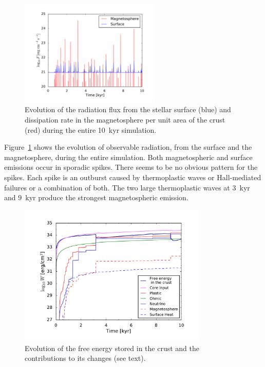 \begin{figure}[h]
\centering
\includegraphics[width=0.6\textwidth]{pics/chap2/lum.pdf} 
\caption[Evolution of the radiation flux]{Evolution of the radiation flux from the stellar surface (blue) and dissipation rate in the magnetosphere per unit area of the crust (red) during the entire 10~kyr simulation.
}
\label{lum}
\end{figure}

Figure~\ref{lum} shows the evolution of observable radiation, from the surface and the magnetosphere, during the entire simulation. 
Both magnetospheric and surface emissions occur in sporadic spikes. 
There seems to be no obvious pattern for the spikes.
Each spike is an outburst caused by thermoplastic waves or Hall-mediated failures or a combination of both. 
The two large thermoplastic waves at $3$~kyr and $9$~kyr produce the strongest magnetospheric emission. 

\begin{figure}[h]
\centering
\includegraphics[width=0.8\textwidth]{pics/chap2/energy.pdf} 
\caption[Evolution of the free energy]{Evolution of the free energy stored in the crust and the contributions to its changes (see text).
}
\label{energy}
\end{figure}

